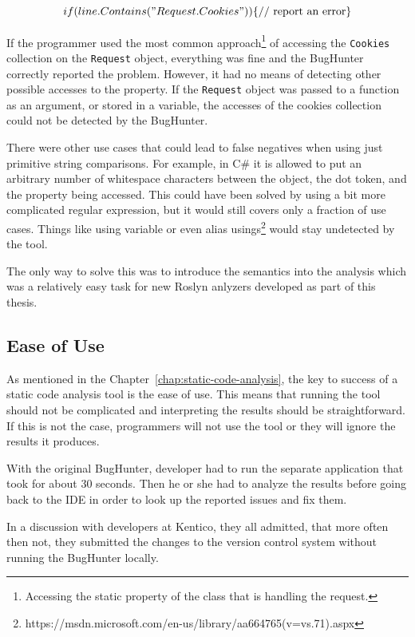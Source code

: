 \documentclass[
  digital, %
  table,   %
  lof,     %
  lot,     %
  oneside,
]{fithesis3}
\begin{document}
$$
if (line.Contains("Request.Cookies")) \\
\{
  \textnormal{// report an error}
\}
$$

If the programmer used the most common approach\footnote{Accessing the static property of the class that is handling the request.} of accessing the \texttt{Cookies} collection on the \texttt{Request} object, everything was fine and the BugHunter correctly reported the problem. However, it had no means of detecting other possible accesses to the property. If the \texttt{Request} object was passed to a function as an argument, or stored in a variable, the accesses of the cookies collection could not be detected by the BugHunter. 

There were other use cases that could lead to false negatives when using just primitive string comparisons. For example, in C\# it is allowed to put an arbitrary number of whitespace characters between the object, the dot token, and the property being accessed. This could have been solved by using a bit more complicated regular expression, but it would still covers only a fraction of use cases. Things like using variable or even alias usings\footnote{https://msdn.microsoft.com/en-us/library/aa664765(v=vs.71).aspx} would stay undetected by the tool. 

The only way to solve this was to introduce the semantics into the analysis which was a relatively easy task for new Roslyn anlyzers developed as part of this thesis.

\subsection{Ease of Use}
As mentioned in the Chapter~\ref{chap:static-code-analysis}, the key to success of a static code analysis tool is the ease of use. This means that running the tool should not be complicated and interpreting the results should be straightforward. If this is not the case, programmers will not use the tool or they will ignore the results it produces. 

With the original BugHunter, developer had to run the separate application that took for about 30 seconds. Then he or she had to analyze the results before going back to the IDE in order to look up the reported issues and fix them. 

In a discussion with developers at Kentico, they all admitted, that more often then not, they submitted the changes to the version control system without running the BugHunter locally. 
\end{document}
